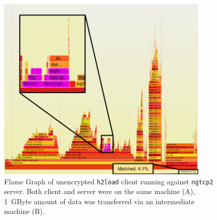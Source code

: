 \documentclass[12pt,a4paper]{report}
\begin{document}
    \begin{figure}[H]
    \centering
    \includegraphics[width=0.9\textwidth]{figs/zoomed_unencrypted_flame_graph_1GByte_h2load.png}
    \caption[Flame Graph of unencrypted \texttt{h2load} client running against \texttt{ngtcp2} server]{Flame Graph of unencrypted \texttt{h2load} client running against \texttt{ngtcp2} server.
    Both client and server were on the same machine (A), 1~GByte amount of data was transferred via an intermediate machine (B).}  
    \label{fig:perf_results_of_unencrypted_h2load}
    \end{figure}
    
    
\end{document}
